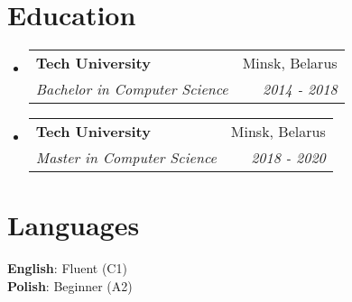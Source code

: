 \documentclass[letterpaper,11pt]{article}
\makeatletter
\newcommand{\resumeSubheading}[4]{
  \vspace{-2pt}\item
    \begin{tabular*}{0.97\textwidth}[t]{l@{\extracolsep{\fill}}r}
      \textbf{#1} & #2 \\
      \textit{\small#3} & \textit{\small #4} \\
    \end{tabular*}\vspace{-7pt}
}
\newcommand{\resumeSubHeadingListStart}{\begin{itemize}[leftmargin=0.15in, label={}]}
\newcommand{\resumeSubHeadingListEnd}{\end{itemize}}
\makeatother
\begin{document}
\section{Education}
  \resumeSubHeadingListStart
    \resumeSubheading
      {Tech University}{Minsk, Belarus}
      {Bachelor in Computer Science}{2014 - 2018}
    \resumeSubheading
      {Tech University}{Minsk, Belarus}
      {Master in Computer Science}{2018 - 2020}
  \resumeSubHeadingListEnd
\section{Languages}
 \begin{itemize}[leftmargin=0.15in, label={}]
    \small{\item{
     \textbf{English}: {Fluent (C1)} \\
     \textbf{Polish}: {Beginner (A2)} \\
    }}
 \end{itemize}
\end{document}
